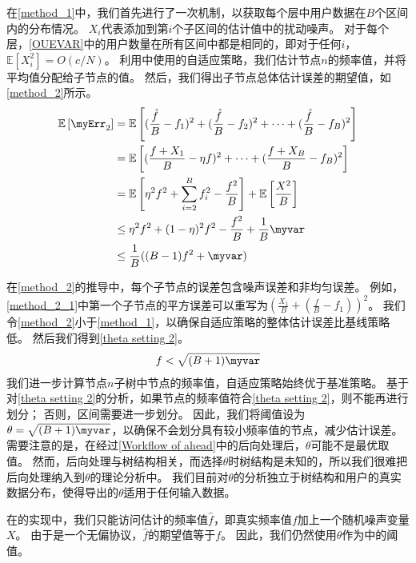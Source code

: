 在\autoref{method_1}中，我们首先进行了一次\oue 机制，以获取每个层中用户数据在$B$个区间内的分布情况。
$X_i$代表添加到第$i$个子区间的估计值中的扰动噪声。
对于每个层，\autoref{OUEVAR}中的用户数量在所有区间中都是相同的，即对于任何$i$，$\mathbb{E}[X_i^2] = O(c/N)$。
利用\myahead 中使用的自适应策略，我们估计节点$n$的频率值，并将平均值分配给子节点的值。
然后，我们得出子节点总体估计误差的期望值，如\autoref{method_2}所示。
\begin{align}
    \mathbb{E}\left[\myErr_2\right] &= \mathbb{E}\left[ (\frac{\hat{f}}{B} - f_1)^2 + (\frac{\hat{f}}{B} - f_2)^2 + \cdots + (\frac{\hat{f}}{B} - f_B)^2 \right]  \nonumber \\
                & = \mathbb{E}\left[ (\frac{f+X_1}{B} - \eta f)^2 + \cdots + (\frac{f+X_B}{B} - f_B)^2 \right] \label{method_2_1} \\
                & = \mathbb{E}\left[ \eta^2 f^2 + \sum_{i=2}^B f_i^2 - \frac{f^2}{B}\right] + \mathbb{E}\left[\frac{X^2}{B} \right]  \nonumber \\
                & \leq \eta^2 f^2 + (1-\eta)^2f^2 - \frac{f^2}{B} + \frac{1}{B}\myvar \label{method_2_6} \\
                & \leq \frac{1}{B}((B-1)f^2+\myvar)
    \label{method_2}
\end{align}  

在\autoref{method_2}的推导中，每个子节点的误差包含噪声误差和非均匀误差。
例如，\autoref{method_2_1}中第一个子节点的平方误差可以重写为$\left(\frac{X_{1}}{B}+\left(\frac{f}{B}-f_{1}\right)\right)^{2}$。
我们令\autoref{method_2}小于\autoref{method_1}，以确保自适应策略的整体估计误差比基线策略低。
然后我们得到\autoref{theta setting 2}。
\begin{align}
    f < \sqrt{(B+1)\myvar}
    \label{theta setting 2}
\end{align}
我们进一步计算节点$n$子树中节点的频率值，自适应策略始终优于基准策略。
基于对\autoref{theta setting 2}的分析，如果节点的频率值符合\autoref{theta setting 2}，则不能再进行划分；
否则，区间需要进一步划分。
因此，我们将阈值设为$\theta=\sqrt{(B+1)\myvar}$，以确保\myahead 不会划分具有较小频率值的节点，减少估计误差。
需要注意的是，在经过\autoref{Workflow of ahead}中的后向处理后，$\theta$可能不是最优取值。
然而，后向处理与树结构相关，而选择$\theta$时树结构是未知的，所以我们很难把后向处理纳入到$\theta$的理论分析中。
我们目前对$\theta$的分析独立于树结构和用户的真实数据分布，使得导出的$\theta$适用于任何输入数据。

在\myahead 的实现中，我们只能访问估计的频率值$\hat{f}$，即真实频率值$f$加上一个随机噪声变量$X$。
由于\oue 是一个无偏协议，$\hat{f}$的期望值等于$f$。
因此，我们仍然使用$\theta$作为\myahead 中的阈值。


